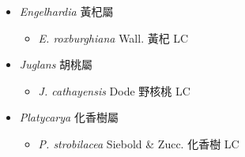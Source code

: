 
  \begin{itemize}
 \item[] \textit{Engelhardia} 黃杞屬
                                
  \begin{itemize}
        \item[] \textit{E. roxburghiana} Wall.  黃杞   LC
  \end{itemize}
 \item[] \textit{Juglans} 胡桃屬
                                
  \begin{itemize}
        \item[] \textit{J. cathayensis} Dode  野核桃   LC
  \end{itemize}
 \item[] \textit{Platycarya} 化香樹屬
                                
  \begin{itemize}
        \item[] \textit{P. strobilacea} Siebold \& Zucc.  化香樹   LC
  \end{itemize}
  \end{itemize}
